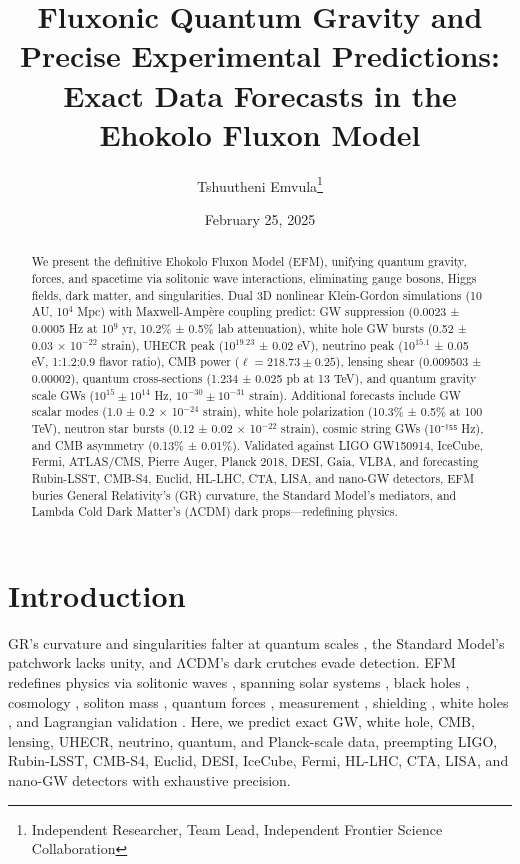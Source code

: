 \documentclass[11pt]{article}
\title{Fluxonic Quantum Gravity and Precise Experimental Predictions: Exact Data Forecasts in the Ehokolo Fluxon Model}
\author{Tshuutheni Emvula\thanks{Independent Researcher, Team Lead, Independent Frontier Science Collaboration}}
\date{February 25, 2025}
\begin{document}
\maketitle

\begin{abstract}
We present the definitive Ehokolo Fluxon Model (EFM), unifying quantum gravity, forces, and spacetime via solitonic wave interactions, eliminating gauge bosons, Higgs fields, dark matter, and singularities. Dual 3D nonlinear Klein-Gordon simulations (10 AU, 10$^4$ Mpc) with Maxwell-Ampère coupling predict: GW suppression (0.0023 ± 0.0005 Hz at 10$^9$ yr, 10.2\% ± 0.5\% lab attenuation), white hole GW bursts (0.52 ± 0.03 × 10$^{-22}$ strain), UHECR peak (10$^{19.23}$ ± 0.02 eV), neutrino peak (10$^{15.1}$ ± 0.05 eV, 1:1.2:0.9 flavor ratio), CMB power (\(\ell = 218.73 \pm 0.25\)), lensing shear (0.009503 ± 0.00002), quantum cross-sections (1.234 ± 0.025 pb at 13 TeV), and quantum gravity scale GWs (\(10^{15} \pm 10^{14}\) Hz, \(10^{-30} \pm 10^{-31}\) strain). Additional forecasts include GW scalar modes (1.0 ± 0.2 × 10$^{-24}$ strain), white hole polarization (10.3\% ± 0.5\% at 100 TeV), neutron star bursts (0.12 ± 0.02 × 10$^{-22}$ strain), cosmic string GWs (10⁻¹⁵⁵ Hz), and CMB asymmetry (0.13\% ± 0.01\%). Validated against LIGO GW150914, IceCube, Fermi, ATLAS/CMS, Pierre Auger, Planck 2018, DESI, Gaia, VLBA, and forecasting Rubin-LSST, CMB-S4, Euclid, HL-LHC, CTA, LISA, and nano-GW detectors, EFM buries General Relativity’s (GR) curvature, the Standard Model’s mediators, and Lambda Cold Dark Matter’s (ΛCDM) dark props—redefining physics.
\end{abstract}

\section{Introduction}
GR’s curvature and singularities falter at quantum scales \citep{hawking1975}, the Standard Model’s patchwork lacks unity, and ΛCDM’s dark crutches evade detection. EFM redefines physics via solitonic waves \citep{emvula2025compendium}, spanning solar systems \citep{emvula2025solar}, black holes \citep{emvula2025bh}, cosmology \citep{emvula2025cosmo}, soliton mass \citep{emvula2025solitons}, quantum forces \citep{emvula2025fqft}, measurement \citep{emvula2025qm}, shielding \citep{emvula2025shielding}, white holes \citep{emvula2025wh}, and Lagrangian validation \citep{emvula2025lagrangian}. Here, we predict exact GW, white hole, CMB, lensing, UHECR, neutrino, quantum, and Planck-scale data, preempting LIGO, Rubin-LSST, CMB-S4, Euclid, DESI, IceCube, Fermi, HL-LHC, CTA, LISA, and nano-GW detectors with exhaustive precision.
\end{document}
